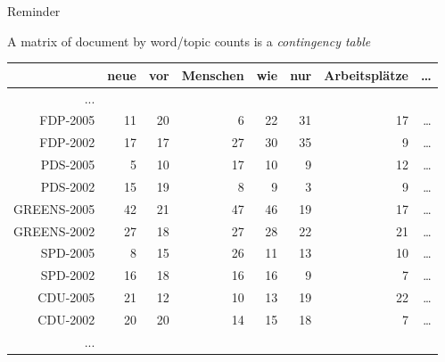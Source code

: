 \documentclass{hertieteaching}
\begin{document}
\begin{frame}{Reminder}

A matrix of document by word/topic counts is a \textit{contingency table}

\begin{center}{\scriptsize
\begin{tabular}{rrrrrrrr} \toprule
          & neue & vor &Menschen& wie &nur & Arbeitsplätze & \ldots \\ \midrule
...\\
FDP-2005  &    11 & 20  &      6 & 22  &31 &            17 & \ldots\\
FDP-2002  &    17 & 17  &     27 & 30  &35  &            9 & \ldots\\
PDS-2005  &     5 & 10  &     17 & 10  & 9   &          12& \ldots\\
PDS-2002  &    15 & 19  &      8  & 9  & 3    &          9& \ldots\\
GREENS-2005  & 42 & 21    &   47 & 46 & 19 &            17& \ldots\\
GREENS-2002  & 27 & 18    &   27 & 28  &22 &            21& \ldots\\
SPD-2005  &     8 & 15 &      26 & 11 & 13     &        10& \ldots\\
SPD-2002  &    16 & 18 &      16 & 16 &  9      &        7& \ldots\\
CDU-2005  &    21 & 12 &      10 & 13 & 19       &      22& \ldots\\
CDU-2002  &    20 & 20 &      14 & 15 & 18        &      7& \ldots\\ 
...\\
\bottomrule
\end{tabular}}
\end{center}

\end{frame}
\end{document}
